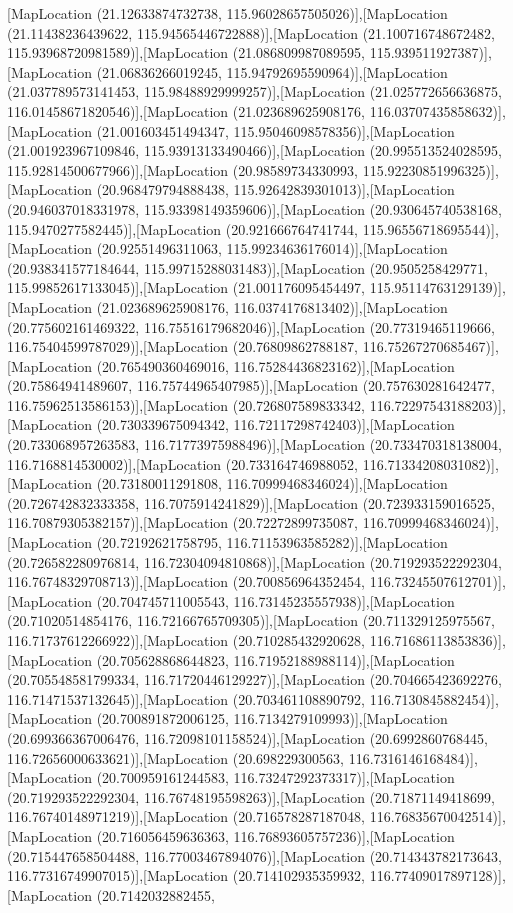 [MapLocation (21.12633874732738, 115.96028657505026)],[MapLocation (21.11438236439622, 115.94565446722888)],[MapLocation (21.100716748672482, 115.93968720981589)],[MapLocation (21.086809987089595, 115.939511927387)],[MapLocation (21.06836266019245, 115.94792695590964)],[MapLocation (21.037789573141453, 115.98488929999257)],[MapLocation (21.025772656636875, 116.01458671820546)],[MapLocation (21.023689625908176, 116.03707435858632)],[MapLocation (21.001603451494347, 115.95046098578356)],[MapLocation (21.001923967109846, 115.93913133490466)],[MapLocation (20.995513524028595, 115.92814500677966)],[MapLocation (20.98589734330993, 115.92230851996325)],[MapLocation (20.968479794888438, 115.92642839301013)],[MapLocation (20.946037018331978, 115.93398149359606)],[MapLocation (20.930645740538168, 115.9470277582445)],[MapLocation (20.921666764741744, 115.96556718695544)],[MapLocation (20.92551496311063, 115.99234636176014)],[MapLocation (20.938341577184644, 115.99715288031483)],[MapLocation (20.9505258429771, 115.99852617133045)],[MapLocation (21.001176095454497, 115.95114763129139)],[MapLocation (21.023689625908176, 116.0374176813402)],[MapLocation (20.775602161469322, 116.75516179682046)],[MapLocation (20.77319465119666, 116.75404599787029)],[MapLocation (20.76809862788187, 116.75267270685467)],[MapLocation (20.765490360469016, 116.75284436823162)],[MapLocation (20.75864941489607, 116.75744965407985)],[MapLocation (20.757630281642477, 116.75962513586153)],[MapLocation (20.726807589833342, 116.72297543188203)],[MapLocation (20.730339675094342, 116.72117298742403)],[MapLocation (20.733068957263583, 116.71773975988496)],[MapLocation (20.733470318138004, 116.7168814530002)],[MapLocation (20.733164746988052, 116.71334208031082)],[MapLocation (20.73180011291808, 116.70999468346024)],[MapLocation (20.726742832333358, 116.7075914241829)],[MapLocation (20.723933159016525, 116.70879305382157)],[MapLocation (20.72272899735087, 116.70999468346024)],[MapLocation (20.72192621758795, 116.71153963585282)],[MapLocation (20.726582280976814, 116.72304094810868)],[MapLocation (20.719293522292304, 116.76748329708713)],[MapLocation (20.700856964352454, 116.73245507612701)],[MapLocation (20.704745711005543, 116.73145235557938)],[MapLocation (20.71020514854176, 116.72166765709305)],[MapLocation (20.711329125975567, 116.71737612266922)],[MapLocation (20.710285432920628, 116.71686113853836)],[MapLocation (20.705628868644823, 116.71952188988114)],[MapLocation (20.705548581799334, 116.71720446129227)],[MapLocation (20.704665423692276, 116.71471537132645)],[MapLocation (20.703461108890792, 116.7130845882454)],[MapLocation (20.700891872006125, 116.7134279109993)],[MapLocation (20.699366367006476, 116.72098101158524)],[MapLocation (20.6992860768445, 116.72656000633621)],[MapLocation (20.698229300563, 116.7316146168484)],[MapLocation (20.700959161244583, 116.73247292373317)],[MapLocation (20.719293522292304, 116.76748195598263)],[MapLocation (20.71871149418699, 116.76740148971219)],[MapLocation (20.716578287187048, 116.76835670042514)],[MapLocation (20.716056459636363, 116.76893605757236)],[MapLocation (20.715447658504488, 116.77003467894076)],[MapLocation (20.714343782173643, 116.77316749907015)],[MapLocation (20.714102935359932, 116.77409017897128)],[MapLocation (20.7142032882455, 